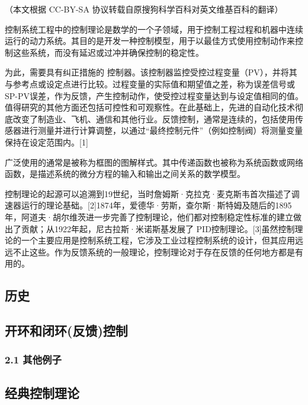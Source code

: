 
（本文根据 CC-BY-SA 协议转载自原搜狗科学百科对英文维基百科的翻译）

控制系统工程中的控制理论是数学的一个子领域，用于控制工程过程和机器中连续运行的动力系统。其目的是开发一种控制模型，用于以最佳方式使用控制动作来控制这些系统，而没有延迟或过冲并确保控制的稳定性。

为此，需要具有纠正措施的 控制器。该控制器监控受控过程变量（PV），并将其与参考点或设定点进行比较。过程变量的实际值和期望值之差，称为误差信号或SP-PV误差，作为反馈，产生控制动作，使受控过程变量达到与设定值相同的值。值得研究的其他方面还包括可控性和可观察性。在此基础上，先进的自动化技术彻底改变了制造业、飞机、通信和其他行业。反馈控制，通常是连续的，包括使用传感器进行测量并进行计算调整，以通过“最终控制元件”（例如控制阀）将测量变量保持在设定范围内。[1]

广泛使用的通常是被称为框图的图解样式。其中传递函数也被称为系统函数或网络函数，是描述系统的微分方程的输入和输出之间关系的数学模型。

控制理论的起源可以追溯到19世纪，当时詹姆斯·克拉克·麦克斯韦首次描述了调速器运行的理论基础。[2]1874年，爱德华·劳斯，查尔斯·斯特姆及随后的1895年，阿道夫·胡尔维茨进一步完善了控制理论，他们都对控制稳定性标准的建立做出了贡献；从1922年起，尼古拉斯·米诺斯基发展了 PID控制理论。[3]虽然控制理论的一个主要应用是控制系统工程，它涉及工业过程控制系统的设计，但其应用远远不止这些。作为反馈系统的一般理论，控制理论对于存在反馈的任何地方都是有用的。

\subsection{历史}



\subsection{开环和闭环(反馈)控制}



\subsubsection{2.1 其他例子}



\subsection{经典控制理论}



